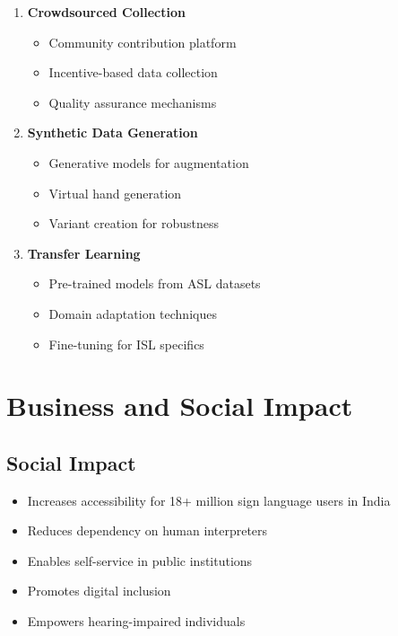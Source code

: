 \begin{enumerate}
    \item \textbf{Crowdsourced Collection}
    \begin{itemize}
        \item Community contribution platform
        \item Incentive-based data collection
        \item Quality assurance mechanisms
    \end{itemize}
    
    \item \textbf{Synthetic Data Generation}
    \begin{itemize}
        \item Generative models for augmentation
        \item Virtual hand generation
        \item Variant creation for robustness
    \end{itemize}
    
    \item \textbf{Transfer Learning}
    \begin{itemize}
        \item Pre-trained models from ASL datasets
        \item Domain adaptation techniques
        \item Fine-tuning for ISL specifics
    \end{itemize}
\end{enumerate}

\section{Business and Social Impact}

\subsection{Social Impact}

\begin{itemize}
    \item Increases accessibility for 18+ million sign language users in India
    \item Reduces dependency on human interpreters
    \item Enables self-service in public institutions
    \item Promotes digital inclusion
    \item Empowers hearing-impaired individuals
\end{itemize}

